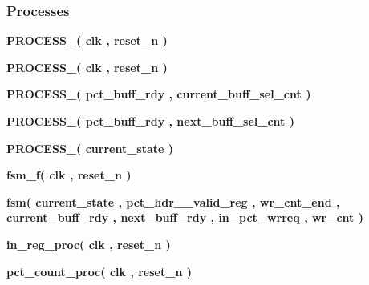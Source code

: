 \subsubsection*{Processes}
 \begin{DoxyCompactItemize}
\item 
{\bf P\+R\+O\+C\+E\+S\+S\+\_}{\bfseries  ( {\bfseries {\bfseries {\bf clk}} \textcolor{vhdlchar}{ }} , {\bfseries {\bfseries {\bf reset\+\_\+n}} \textcolor{vhdlchar}{ }} )}
\item 
{\bf P\+R\+O\+C\+E\+S\+S\+\_}{\bfseries  ( {\bfseries {\bfseries {\bf clk}} \textcolor{vhdlchar}{ }} , {\bfseries {\bfseries {\bf reset\+\_\+n}} \textcolor{vhdlchar}{ }} )}
\item 
{\bf P\+R\+O\+C\+E\+S\+S\+\_}{\bfseries  ( {\bfseries {\bfseries {\bf pct\+\_\+buff\+\_\+rdy}} \textcolor{vhdlchar}{ }} , {\bfseries {\bfseries {\bf current\+\_\+buff\+\_\+sel\+\_\+cnt}} \textcolor{vhdlchar}{ }} )}
\item 
{\bf P\+R\+O\+C\+E\+S\+S\+\_}{\bfseries  ( {\bfseries {\bfseries {\bf pct\+\_\+buff\+\_\+rdy}} \textcolor{vhdlchar}{ }} , {\bfseries {\bfseries {\bf next\+\_\+buff\+\_\+sel\+\_\+cnt}} \textcolor{vhdlchar}{ }} )}
\item 
{\bf P\+R\+O\+C\+E\+S\+S\+\_}{\bfseries  ( {\bfseries {\bfseries {\bf current\+\_\+state}} \textcolor{vhdlchar}{ }} )}
\item 
{\bf fsm\+\_\+f}{\bfseries  ( {\bfseries {\bfseries {\bf clk}} \textcolor{vhdlchar}{ }} , {\bfseries {\bfseries {\bf reset\+\_\+n}} \textcolor{vhdlchar}{ }} )}
\item 
{\bf fsm}{\bfseries  ( {\bfseries {\bfseries {\bf current\+\_\+state}} \textcolor{vhdlchar}{ }} , {\bfseries {\bfseries {\bf pct\+\_\+hdr\+\_\+\_\+valid\+\_\+reg}} \textcolor{vhdlchar}{ }} , {\bfseries {\bfseries {\bf wr\+\_\+cnt\+\_\+end}} \textcolor{vhdlchar}{ }} , {\bfseries {\bfseries {\bf current\+\_\+buff\+\_\+rdy}} \textcolor{vhdlchar}{ }} , {\bfseries {\bfseries {\bf next\+\_\+buff\+\_\+rdy}} \textcolor{vhdlchar}{ }} , {\bfseries {\bfseries {\bf in\+\_\+pct\+\_\+wrreq}} \textcolor{vhdlchar}{ }} , {\bfseries {\bfseries {\bf wr\+\_\+cnt}} \textcolor{vhdlchar}{ }} )}
\item 
{\bf in\+\_\+reg\+\_\+proc}{\bfseries  ( {\bfseries {\bfseries {\bf clk}} \textcolor{vhdlchar}{ }} , {\bfseries {\bfseries {\bf reset\+\_\+n}} \textcolor{vhdlchar}{ }} )}
\item 
{\bf pct\+\_\+count\+\_\+proc}{\bfseries  ( {\bfseries {\bfseries {\bf clk}} \textcolor{vhdlchar}{ }} , {\bfseries {\bfseries {\bf reset\+\_\+n}} \textcolor{vhdlchar}{ }} )}

\end{DoxyCompactItemize}
